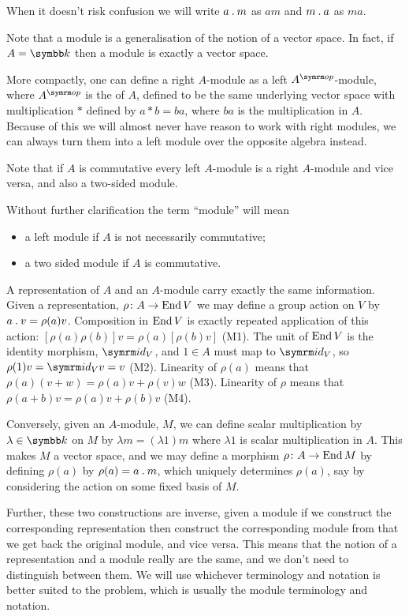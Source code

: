 When it doesn't risk confusion we will write \(a \mathbin{.} m\) as \(am\) and \(m \mathbin{.} a\) as \(ma\).

Note that a module is a generalisation of the notion of a vector space.
In fact, if \(A = \field\) then a module is exactly a vector space.

More compactly, one can define a right \(A\)-module as a left \(A^{\op}\)-module, where \(A^{\op}\) is the  of \(A\), defined to be the same underlying vector space with multiplication \(*\) defined by \(a * b = ba\), where \(ba\) is the multiplication in \(A\).
Because of this we will almost never have reason to work with right modules, we can always turn them into a left module over the opposite algebra instead.

Note that if \(A\) is commutative every left \(A\)-module is a right \(A\)-module and vice versa, and also a two-sided module.

Without further clarification the term \enquote{module} will mean
\begin{itemize}
    \item a left module if \(A\) is not necessarily commutative;
    \item a two sided module if \(A\) is commutative.
\end{itemize}

A representation of \(A\) and an \(A\)-module carry exactly the same information.
Given a representation, \(\rho \colon A \to \operatorname{End} V\) we may define a group action on \(V\) by \(a \mathbin{.} v = \rho(a)v\).
Composition in \(\operatorname{End} V\) is exactly repeated application of this action: \([\rho(a)\rho(b)]v = \rho(a)[\rho(b)v]\) (M1).
The unit of \(\operatorname{End} V\) is the identity morphism, \(\id_V\), and \(1 \in A\) must map to \(\id_V\), so \(\rho(1)v = \id_V v = v\) (M2).
Linearity of \(\rho(a)\) means that \(\rho(a)(v + w) = \rho(a)v + \rho(v)w\) (M3).
Linearity of \(\rho\) means that \(\rho(a + b)v = \rho(a)v + \rho(b)v\) (M4).

Conversely, given an \(A\)-module, \(M\), we can define scalar multiplication by \(\lambda \in \field\) on \(M\) by \(\lambda m = (\lambda 1) m\) where \(\lambda 1\) is scalar multiplication in \(A\).
This makes \(M\) a vector space, and we may define a morphism \(\rho \colon A \to \operatorname{End} M\) by defining \(\rho(a)\) by \(\rho(a) = a \mathbin{.} m\), which uniquely determines \(\rho(a)\), say by considering the action on some fixed basis of \(M\).

Further, these two constructions are inverse, given a module if we construct the corresponding representation then construct the corresponding module from that we get back the original module, and vice versa.
This means that the notion of a representation and a module really are the same, and we don't need to distinguish between them.
We will use whichever terminology and notation is better suited to the problem, which is usually the module terminology and notation.

